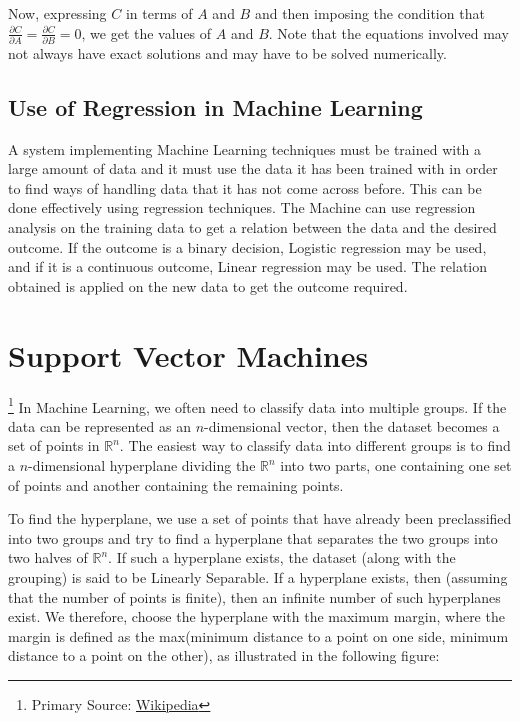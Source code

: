 \documentclass[12 pt]{report}
\begin{document}
    Now, expressing $C$ in terms of $A$ and $B$ and then imposing the condition that $\frac{\partial C}{\partial A} = \frac{\partial C}{\partial B} = 0$, 
    we get the values of $A$ and $B$. Note that the equations involved may not always have exact solutions and may have to be solved numerically.

    \section{Use of Regression in Machine Learning}
    A system implementing Machine Learning techniques must be trained with a large amount of data and it must use the data it has been trained with 
    in order to find ways of handling data that it has not come across before. This can be done effectively using regression techniques. The Machine 
    can use regression analysis on the training data to get a relation between the data and the desired outcome. If the outcome is a binary decision, 
    Logistic regression may be used, and if it is a continuous outcome, Linear regression may be used. The relation obtained is applied on the new data 
    to get the outcome required.

    \chapter{Support Vector Machines} \footnote {Primary Source: \href{https://en.wikipedia.org/wiki/Support-vector_machine}{Wikipedia}}
    In Machine Learning, we often need to classify data into multiple groups. If the data can be represented as an $n$-dimensional vector, then 
    the dataset becomes a set of points in $\mathbb{R}^{n}$. The easiest way to classify data into different groups is to find a $n$-dimensional 
    hyperplane dividing the $\mathbb{R}^{n}$ into two parts, one containing one set of points and another containing the remaining points.

    To find the hyperplane, we use a set of points that have already been preclassified into two groups and try to find a hyperplane that separates the two 
    groups into two halves of $\mathbb{R}^{n}$. 
    If such a hyperplane exists, the dataset (along with the grouping) is said to be Linearly Separable.
    If a hyperplane exists, then (assuming that the number of points is finite), then an infinite number of such hyperplanes exist.
    We therefore, choose the hyperplane with the maximum margin, where the margin is defined as the max(minimum distance to a point on one side, minimum distance to a point on the other), 
    as illustrated in the following figure:
\end{document}
